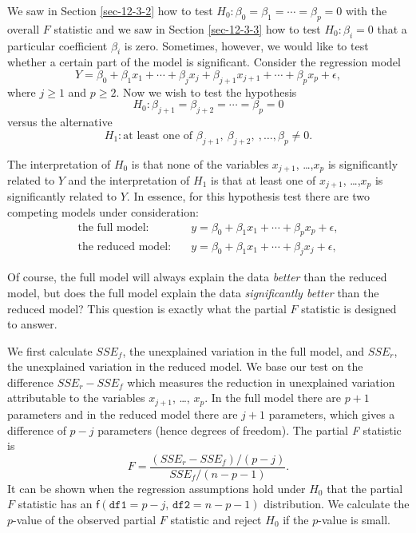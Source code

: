 We saw in Section \ref{sec-12-3-2} how to test
\(H_{0}:\beta_{0}=\beta_{1}=\cdots=\beta_{p}=0\) with the overall
\(F\) statistic and we saw in Section \ref{sec-12-3-3} how to
test \(H_{0}:\beta_{i}=0\) that a particular coefficient \(\beta_{i}\)
is zero. Sometimes, however, we would like to test whether a certain
part of the model is significant. Consider the regression model
\begin{equation}
Y=\beta_{0}+\beta_{1}x_{1}+\cdots+\beta_{j}x_{j}+\beta_{j+1}x_{j+1}+\cdots+\beta_{p}x_{p}+\epsilon,
\end{equation}
where \(j\geq1\) and \(p\geq2\). Now we wish to test the hypothesis
\begin{equation}
H_{0}:\beta_{j+1}=\beta_{j+2}=\cdots=\beta_{p}=0
\end{equation}
versus the alternative 
\begin{equation}
H_{1}:\mbox{at least one of $\beta_{j+1},\ \beta_{j+2},\ ,\ldots,\beta_{p}\neq0$}.
\end{equation}

The interpretation of \(H_{0}\) is that none of the variables
\(x_{j+1}\), \ldots{},\(x_{p}\) is significantly related to \(Y\) and the
interpretation of \(H_{1}\) is that at least one of \(x_{j+1}\),
\ldots{},\(x_{p}\) is significantly related to \(Y\). In essence, for this
hypothesis test there are two competing models under consideration:
\begin{align}
\mbox{the full model:} & \quad y=\beta_{0}+\beta_{1}x_{1}+\cdots+\beta_{p}x_{p}+\epsilon,\\
\mbox{the reduced model:} & \quad y=\beta_{0}+\beta_{1}x_{1}+\cdots+\beta_{j}x_{j}+\epsilon,
\end{align}

Of course, the full model will always explain the data \emph{better} than
the reduced model, but does the full model explain the data
\emph{significantly better} than the reduced model? This question is
exactly what the partial \(F\) statistic is designed to answer.

We first calculate \(SSE_{f}\), the unexplained variation in the full
model, and \(SSE_{r}\), the unexplained variation in the reduced
model. We base our test on the difference \(SSE_{r}-SSE_{f}\) which
measures the reduction in unexplained variation attributable to the
variables \(x_{j+1}\), \ldots{}, \(x_{p}\). In the full model there are
\(p+1\) parameters and in the reduced model there are \(j+1\)
parameters, which gives a difference of \(p-j\) parameters (hence
degrees of freedom). The partial \emph{F} statistic is
\begin{equation}
F=\frac{(SSE_{r}-SSE_{f})/(p-j)}{SSE_{f}/(n-p-1)}.
\end{equation}
It can be shown when the regression assumptions hold under \(H_{0}\)
that the partial \(F\) statistic has an
\(\mathsf{f}(\mathtt{df1}=p-j,\,\mathtt{df2}=n-p-1)\) distribution. We
calculate the \(p\)-value of the observed partial \(F\) statistic and
reject \(H_{0}\) if the \(p\)-value is small.

